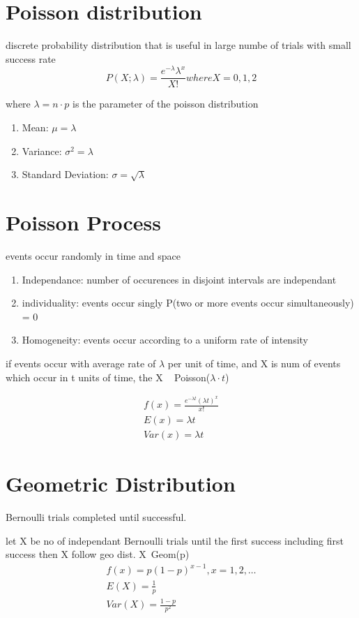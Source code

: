 \documentclass[11pt]{amsart}
\begin{document}
\section{Poisson distribution}
\par discrete probability distribution that is useful in large numbe of trials
with small success rate
\begin{equation}
  P(X;\lambda) = \frac{e^{-\lambda} \lambda^x}{X!} where X = 0,1,2
\end{equation}
\par where $\lambda = n \cdot p$ is the parameter of the poisson distribution
\begin{enumerate}
\item Mean: $\mu = \lambda$
\item Variance: $\sigma^2 = \lambda$
\item Standard Deviation: $\sigma = \sqrt{\lambda}$
\end{enumerate}
\section{Poisson Process}
\par events occur randomly in time and space
\begin{enumerate}
\item Independance: number of occurences in disjoint intervals are independant
\item individuality: events occur singly P(two or more events occur simultaneously) = 0
\item Homogeneity: events occur according to a uniform rate of intensity
\end{enumerate}
\par if events occur with average rate of $\lambda$ per unit of time, and X is num of events which occur in t units of time, the X ~ Poisson($\lambda\cdot t$)
\begin{equation *}

\begin{align}
f(x)  = \frac{e^{-\lambda t}(\lambda t)^x}{x!}\\
E(x) = \lambda t\\
Var(x) = \lambda t
\end{align}
\end{equation *}
\section{Geometric Distribution}
\par Bernoulli trials completed until successful.
\par let X be no of independant Bernoulli trials until the first success including first success then X follow geo dist. X~Geom(p)
\begin{equation}
\begin{align*}
f(x) = p(1-p)^{x-1}, x = 1,2,\dots\\
E(X) = \frac{1}{p}\\
Var(X) = \frac{1-p}{p^2}
\end{align*}
\end{equation}
\end{document}
